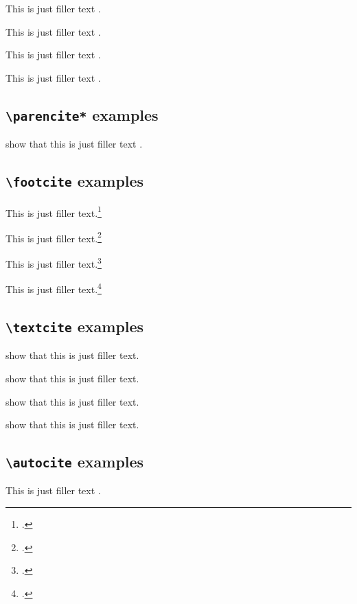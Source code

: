\documentclass[a4paper]{article}
\newcommand{\cmd}[1]{\texttt{\textbackslash #1}}
\begin{document}
This is just filler text \parencite{companion}.

This is just filler text \parencite[59]{companion}.

This is just filler text \parencite[see][]{companion}.

This is just filler text \parencite[see][59--63]{companion}.

\subsection*{\cmd{parencite*} examples}

\citeauthor{companion} show that this is just filler
text \parencite*{companion}.

\subsection*{\cmd{footcite} examples}


This is just filler text.\footcite{companion}

This is just filler text.\footcite[59]{companion}

This is just filler text.\footcite[See][]{companion}

This is just filler text.\footcite[See][59--63]{companion}

\subsection*{\cmd{textcite} examples}

\textcite{companion} show that this is just filler text.

\textcite[59]{companion} show that this is just filler text.

\textcite[see][]{companion} show that this is just filler text.

\textcite[see][59--63]{companion} show that this is just filler text.

\subsection*{\cmd{autocite} examples}


This is just filler text \autocite{companion}.
\end{document}
